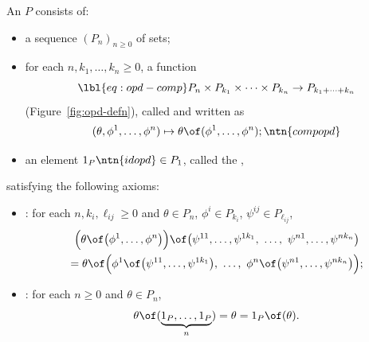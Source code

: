 \begin{defn}
An  $P$ consists of:
% 
\begin{itemize}
\item 
a sequence $(P_n)_{n \geq 0}$ of sets;

\item
for each $n, k_1, \ldots, k_n \geq 0$, a function
% 
\begin{equation}
\lbl{eq:opd-comp}
P_n \times P_{k_1} \times \cdots \times P_{k_n} 
\to
P_{k_1 + \cdots + k_n}
\end{equation}
% 
(Figure~\ref{fig:opd-defn}), called %
%
% 
and written as
\[
(\theta, \phi^1, \ldots, \phi^n) \mapsto 
\theta \of (\phi^1, \ldots, \phi^n);
\ntn{compopd}
\]

\item
an element $1_P\ntn{idopd} \in P_1$, called the ,%
%
\end{itemize}
% 
satisfying the following axioms:
% 
\begin{itemize}
\item 
{}:%
%
%
% 
for each $n, k_i, \ell_{i j} \geq 0$ and $\theta
\in P_n$, $\phi^i \in P_{k_i}$, $\psi^{i j} \in P_{\ell_{i j}}$, 
% 
\begin{multline*}
\Bigl( \theta \of \bigl(\phi^1, \ldots, \phi^n\bigr) \Bigr) \of
\bigl(\psi^{1 1}, \ldots, \psi^{1 k_1}, 
\ \ldots, \ 
\psi^{n 1}, \ldots, \psi^{n k_n}\bigr)\\
=
\theta \of \Bigl(
\phi^1 \of \bigl(\psi^{1 1}, \ldots, \psi^{1 k_1}\bigr), 
\ \ldots, \ 
\phi^n \of \bigl(\psi^{n 1}, \ldots, \psi^{n k_n}\bigr) 
\Bigr);
\end{multline*}

\item
{}:%
%
% 
for each $n \geq 0$ and $\theta \in P_n$,
\[
\theta \of (\underbrace{1_P, \ldots, 1_P}_n) 
= 
\theta
=
1_P \of (\theta).
\]
\end{itemize}
\end{defn}

